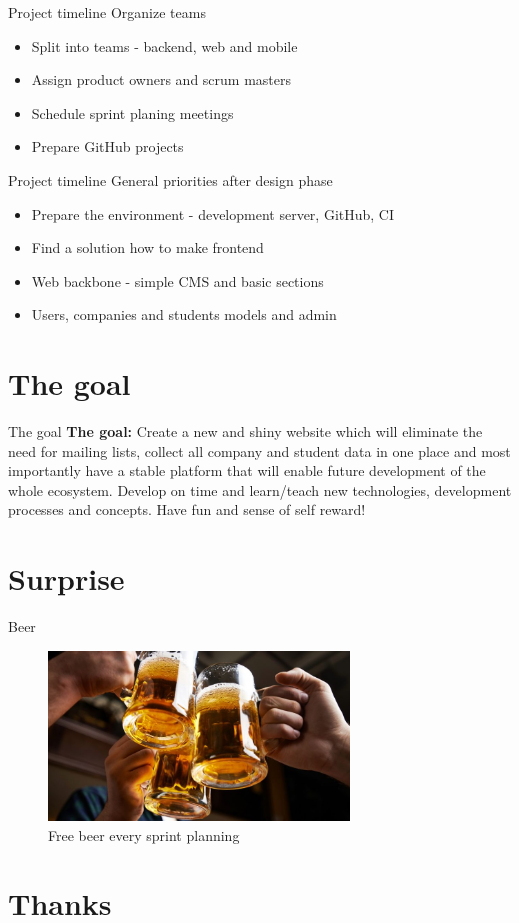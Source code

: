 \documentclass{beamer}
\begin{document}
	\begin{frame}{Project timeline}
		Organize teams
		\begin{itemize}
			\item Split into teams - backend, web and mobile
			\item Assign product owners and scrum masters
			\item Schedule sprint planing meetings
			\item Prepare GitHub projects
		\end{itemize}
	\end{frame}

	\begin{frame}{Project timeline}
		General priorities after design phase
		\begin{itemize}
			\item Prepare the environment - development server, GitHub, CI
			\item Find a solution how to make frontend
			\item Web backbone - simple CMS and basic sections
			\item Users, companies and students models and admin
		\end{itemize}
	\end{frame}

	\section{The goal}
	
	\begin{frame}{The goal}
		\textbf{The goal:} Create a new and shiny website which will eliminate the need for mailing lists, collect all company and student data in one place and most importantly have a stable platform that will enable future development of the whole ecosystem. Develop on time and learn/teach new technologies, development processes and concepts. Have fun and sense of self reward!
	\end{frame}
	
	\section{Surprise}
	
	\begin{frame}{Beer}
		\begin{figure}
			\includegraphics[width=8cm]{beer}
			\caption{Free beer every sprint planning}
		\end{figure}
	\end{frame}

	\section{Thanks}
\end{document}
